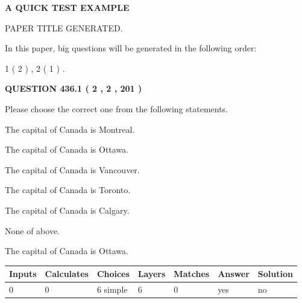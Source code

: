 \documentclass[12pt]{article}
\begin{document}
   
   
   
   
   
 \vspace{0.2in}
{\LARGE {\textbf{ A QUICK TEST EXAMPLE}}}
   
   
 PAPER TITLE GENERATED.
   
   
   
\vspace{0.2in}
   
In this paper, big questions will be generated in the following order: 
   
   
   1 ( 2 )
 ,
   2 ( 1 )
 .
  
\vspace{0.2in}
  
{\textbf{\Large{QUESTION
436.1 
 ( 2 , 2 , 201 )
}}}
  
  
Please choose the correct one from the following statements.
 
 
The capital of Canada is Montreal.
 
 
The capital of Canada is Ottawa.
 
 
The capital of Canada is Vancouver.
 
 
The capital of Canada is Toronto.
 
 
The capital of Canada is Calgary.
 
 
 None of above.
 
 
\noindent{}
 
 
The capital of Canada is Ottawa.
 
 
\noindent{}
 
 
   
   
   
   
\noindent\begin{tabular}{|l|l|l|l|l|l|l|}
 \hline
Inputs & Calculates & Choices & Layers & Matches & Answer & Solution \\ \hline
 0  & 
 0  & 
 6
  simple  
  & 
 6  & 
 0  & 
  yes & 
  no 
  \\ \hline
 \end{tabular}
   
   
   
\end{document}
